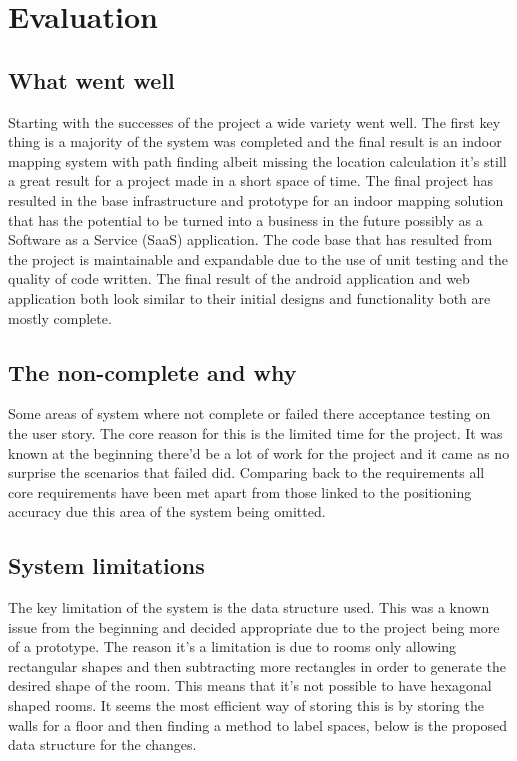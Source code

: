 \section{Evaluation}
\subsection{What went well} %
Starting with the successes of the project a wide variety went well. The first key thing is a majority of the system was completed and the final result is an indoor mapping system with path finding albeit missing the location calculation it's still a great result for a project made in a short space of time. The final project has resulted in the base infrastructure and prototype for an indoor mapping solution that has the potential to be turned into a business in the future possibly as a Software as a Service (SaaS) application. The code base that has resulted from the project is maintainable and expandable due to the use of unit testing and the quality of code written. The final result of the android application and web application both look similar to their initial designs and functionality both are mostly complete.

\subsection{The non-complete and why}
Some areas of system where not complete or failed there acceptance testing on the user story. The core reason for this is the limited time for the project. It was known at the beginning there'd be a lot of work for the project and it came as no surprise the scenarios that failed did. Comparing back to the requirements all core requirements have been met apart from those linked to the positioning accuracy due this area of the system being omitted.

\subsection{System limitations}
The key limitation of the system is the data structure used. This was a known issue from the beginning and decided appropriate due to the project being more of a prototype. The reason it's a limitation is due to rooms only allowing rectangular shapes and then subtracting more rectangles in order to generate the desired shape of the room. This means that it's not possible to have hexagonal shaped rooms. It seems the most efficient way of storing this is by storing the walls for a floor and then finding a method to label spaces, below is the proposed data structure for the changes. 

